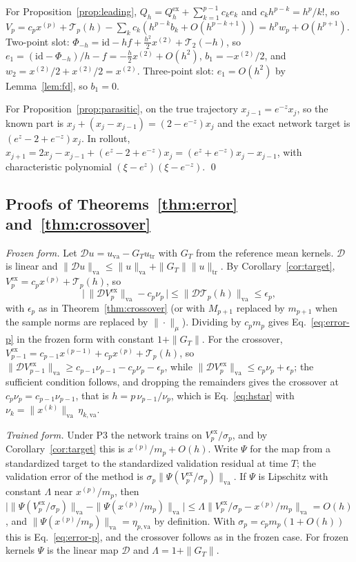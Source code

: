 \documentclass[11pt]{article}
\theoremstyle{definition}
\theoremstyle{remark}
\newcommand{\ex}{\mathrm{ex}}
\newcommand{\tr}{\mathrm{tr}}
\newcommand{\va}{\mathrm{va}}
\newcommand{\Dmap}{\mathcal{D}}
\newcommand{\id}{\mathrm{id}}
\newcommand{\Rem}{\mathcal{T}}
\begin{document}
For Proposition~\ref{prop:leading}, $Q_h = Q_h^\ex + \sum_{k=1}^{p-1}c_ke_k$ and $c_kh^{p-k} = h^p/k!$, so $V_p = c_px^{(p)} + \Rem_p(h) - \sum_kc_k(h^{p-k}b_k + O(h^{p-k+1})) = h^pw_p + O(h^{p+1})$.
Two-point slot: $\Phi_{-h} = \id - hf + \tfrac{h^2}{2}x^{(2)} + \Rem_2(-h)$, so $e_1 = (\id - \Phi_{-h})/h - f = -\tfrac h2x^{(2)} + O(h^2)$, $b_1 = -x^{(2)}/2$, and $w_2 = x^{(2)}/2 + x^{(2)}/2 = x^{(2)}$.
Three-point slot: $e_1 = O(h^2)$ by Lemma~\ref{lem:fd}, so $b_1 = 0$.

For Proposition~\ref{prop:parasitic}, on the true trajectory $x_{j-1} = e^{-z}x_j$, so the known part is $x_j + (x_j - x_{j-1}) = (2 - e^{-z})x_j$ and the exact network target is $(e^z - 2 + e^{-z})x_j$.
In rollout, $x_{j+1} = 2x_j - x_{j-1} + (e^z - 2 + e^{-z})x_j = (e^z + e^{-z})x_j - x_{j-1}$, with characteristic polynomial $(\xi - e^z)(\xi - e^{-z})$. \qed

\subsection{Proofs of Theorems~\ref{thm:error} and~\ref{thm:crossover}}\label{app:error}
\emph{Frozen form.}
Let $\Dmap u = u_\va - G_Tu_\tr$ with $G_T$ from the reference mean kernels.
$\Dmap$ is linear and $\|\Dmap u\|_\va \le \|u\|_\va + \|G_T\|\|u\|_\tr$.
By Corollary~\ref{cor:target}, $V_p^\ex = c_px^{(p)} + \Rem_p(h)$, so
\begin{equation}\label{eq:frozen-error}
\big|\,\|\Dmap V_p^\ex\|_\va - c_p\nu_p\,\big| \le \|\Dmap\Rem_p(h)\|_\va \le \epsilon_p ,
\end{equation}
with $\epsilon_p$ as in Theorem~\ref{thm:crossover} (or with $M_{p+1}$ replaced by $m_{p+1}$ when the sample norms are replaced by $\|\cdot\|_\mu$).
Dividing by $c_pm_p$ gives Eq.~\eqref{eq:error-p} in the frozen form with constant $1 + \|G_T\|$.
For the crossover, $V_{p-1}^\ex = c_{p-1}x^{(p-1)} + c_px^{(p)} + \Rem_p(h)$, so $\|\Dmap V_{p-1}^\ex\|_\va \ge c_{p-1}\nu_{p-1} - c_p\nu_p - \epsilon_p$, while $\|\Dmap V_p^\ex\|_\va \le c_p\nu_p + \epsilon_p$; the sufficient condition follows, and dropping the remainders gives the crossover at $c_p\nu_p = c_{p-1}\nu_{p-1}$, that is $h = p\,\nu_{p-1}/\nu_p$, which is Eq.~\eqref{eq:hstar} with $\nu_k = \|x^{(k)}\|_\va\,\eta_{k,\va}$.

\emph{Trained form.}
Under P3 the network trains on $V_p^\ex/\sigma_p$, and by Corollary~\ref{cor:target} this is $x^{(p)}/m_p + O(h)$.
Write $\Psi$ for the map from a standardized target to the standardized validation residual at time $T$; the validation error of the method is $\sigma_p\|\Psi(V_p^\ex/\sigma_p)\|_\va$.
If $\Psi$ is Lipschitz with constant $\Lambda$ near $x^{(p)}/m_p$, then $\big|\|\Psi(V_p^\ex/\sigma_p)\|_\va - \|\Psi(x^{(p)}/m_p)\|_\va\big| \le \Lambda\|V_p^\ex/\sigma_p - x^{(p)}/m_p\|_\va = O(h)$, and $\|\Psi(x^{(p)}/m_p)\|_\va = \eta_{p,\va}$ by definition.
With $\sigma_p = c_pm_p(1 + O(h))$ this is Eq.~\eqref{eq:error-p}, and the crossover follows as in the frozen case.
For frozen kernels $\Psi$ is the linear map $\Dmap$ and $\Lambda = 1 + \|G_T\|$.
\end{document}
